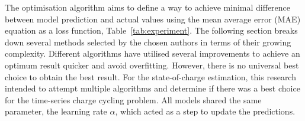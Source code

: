 The optimisation algorithm aims to define a way to achieve minimal difference between model prediction and actual values using the mean average error (MAE) equation as a loss function, \mbox{Table~\ref{tab:experiment}}.
The following section breaks down several methods selected by the chosen authors in terms of their growing complexity.
Different algorithms have utilised several improvements to achieve an optimum result quicker and avoid overfitting.
However, there is no universal best choice to obtain the best result.
For the state-of-charge estimation, this research intended to attempt multiple algorithms and determine if there was a best choice for the time-series charge cycling problem.
All models shared the same parameter, the learning rate $\alpha$, which acted as a step to update the predictions.
